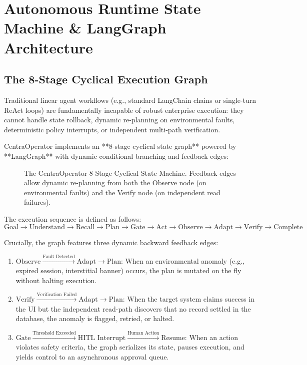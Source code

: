 \section{Autonomous Runtime State Machine \& LangGraph Architecture}
\label{sec:runtime_state_graph}

\subsection{The 8-Stage Cyclical Execution Graph}
Traditional linear agent workflows (e.g., standard LangChain chains or single-turn ReAct loops) are fundamentally incapable of robust enterprise execution: they cannot handle state rollback, dynamic re-planning on environmental faults, deterministic policy interrupts, or independent multi-path verification.

CentraOperator implements an **8-stage cyclical state graph** powered by **LangGraph** with dynamic conditional branching and feedback edges:

\begin{figure}[htbp]
  \centering
  
  \caption{The CentraOperator 8-Stage Cyclical State Machine. Feedback edges allow dynamic re-planning from both the Observe node (on environmental faults) and the Verify node (on independent read failures).}
  \label{fig:graph_cyclical}
\end{figure}

The execution sequence is defined as follows:
\begin{equation}
  \text{Goal} \xrightarrow{} \text{Understand} \xrightarrow{} \text{Recall} \xrightarrow{} \text{Plan} \xrightarrow{} \text{Gate} \xrightarrow{} \text{Act} \xrightarrow{} \text{Observe} \xrightarrow{} \text{Adapt} \xrightarrow{} \text{Verify} \xrightarrow{} \text{Complete}
\end{equation}

Crucially, the graph features three dynamic backward feedback edges:
\begin{enumerate}
  \item $\text{Observe} \xrightarrow{\text{Fault Detected}} \text{Adapt} \xrightarrow{} \text{Plan}$: When an environmental anomaly (e.g., expired session, interstitial banner) occurs, the plan is mutated on the fly without halting execution.
  \item $\text{Verify} \xrightarrow{\text{Verification Failed}} \text{Adapt} \xrightarrow{} \text{Plan}$: When the target system claims success in the UI but the independent read-path discovers that no record settled in the database, the anomaly is flagged, retried, or halted.
  \item $\text{Gate} \xrightarrow{\text{Threshold Exceeded}} \text{HITL Interrupt} \xrightarrow{\text{Human Action}} \text{Resume}$: When an action violates safety criteria, the graph serializes its state, pauses execution, and yields control to an asynchronous approval queue.
\end{enumerate}

